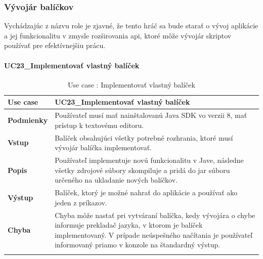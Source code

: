 \subsubsection{Vývojár balíčkov}
\indent Vychádzajúc z názvu role je zjavné, že tento hráč sa bude starať o vývoj aplikácie a jej funkcionalitu v zmysle rozširovania \acrshort{api}, ktoré môže vývojár skriptov používať pre efektívnejšiu prácu.
\paragraph{UC23\_Implementovať vlastný balíček}
\begin{center}
	\begin{longtable}{|p{2.5cm}|p{12.2cm}|}
		
			\hline
			\textbf{Use case} & UC23\_Implementovať vlastný balíček \\ 
			\hline
			\textbf{Podmienky} & Používateľ musí mať nainštalovanú Java SDK vo verzii 8, mať prístup k textovému editoru.  \\ 
			\hline
			\textbf{Vstup} & Balíček obsahujúci všetky potrebné rozhrania, ktoré musí vývojár balíčka implementovať.\\
			\hline
			\textbf{Popis} & Používateľ implementuje novú funkcionalitu v Jave, následne všetky zdrojové súbory skompiluje a pridá do \acrshort{jar} súboru určeného na ukladanie nových balíčkov.\\ 
			\hline
			\textbf{Výstup} & Balíček, ktorý je možné nahrať do aplikácie a používať ako jeden z príkazov.\\
			\hline
			\textbf{Chyba} & Chyba môže nastať pri vytváraní balíčka, kedy vývojára o chybe informuje prekladač jazyka, v ktorom je balíček implementovaný. V prípade neúspešného načítania je používateľ informovaný priamo v konzole na štandardný výstup.\\
			\hline
		\caption{Use case : Implementovať vlastný balíček}
		\label{table:1}
		
	\end{longtable}
\end{center}

